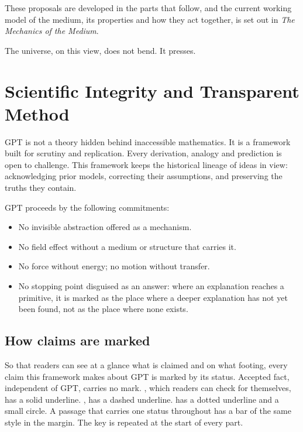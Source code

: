 \documentclass[11pt,a4paper]{article}
\begin{document}
These proposals are developed in the parts that follow, and the current working model of the medium, its properties and how they act together, is set out in \emph{The Mechanics of the Medium}.

The universe, on this view, does not bend. It presses.

\section{Scientific Integrity and Transparent Method}

GPT is not a theory hidden behind inaccessible mathematics. It is a framework built for scrutiny and replication. Every derivation, analogy and prediction is open to challenge. This framework keeps the historical lineage of ideas in view: acknowledging prior models, correcting their assumptions, and preserving the truths they contain.

GPT proceeds by the following commitments:

\begin{itemize}
  \item No invisible abstraction offered as a mechanism.
  \item No field effect without a medium or structure that carries it.
  \item No force without energy; no motion without transfer.
  \item No stopping point disguised as an answer: where an explanation reaches a primitive, it is marked as the place where a deeper explanation has not yet been found, not as the place where none exists.
\end{itemize}

\subsection*{How claims are marked}

So that readers can see at a glance what is claimed and on what footing, every claim this framework makes about GPT is marked by its status. Accepted fact, independent of GPT, carries no mark. , which readers can check for themselves, has a solid underline. , has a dashed underline.  has a dotted underline and a small circle. A passage that carries one status throughout has a bar of the same style in the margin. The key is repeated at the start of every part.
\end{document}
